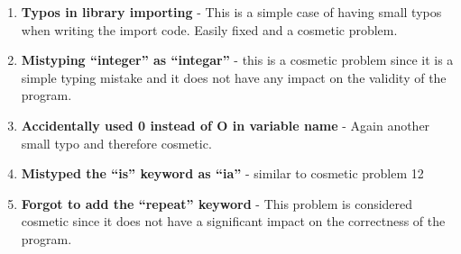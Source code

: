 \begin{enumerate}
\item \textbf{Typos in library importing} - This is a simple case of having small typos when writing the import code. Easily fixed and a cosmetic problem.
\item \textbf{Mistyping “integer” as “integar”}  - this is a cosmetic problem since it is a simple typing mistake and it does not have any impact on the validity of the program.
\item \textbf{ Accidentally used 0 instead of O in variable name}  - Again another small typo and therefore cosmetic.
\item \textbf{Mistyped the “is” keyword as “ia”}  - similar to cosmetic problem 12
\item \textbf{Forgot to add the “repeat” keyword} - This problem is considered cosmetic since it does not have a significant impact on the correctness of the program.
\end{enumerate}


